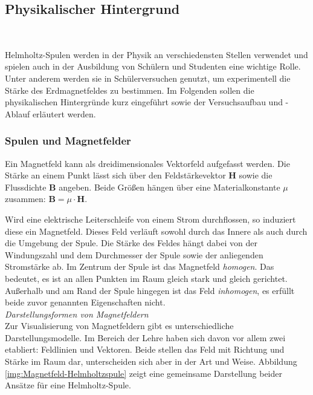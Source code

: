 \subsection{Physikalischer Hintergrund}
\begin{center}
	\\
\end{center}


Helmholtz-Spulen werden in der Physik an verschiedensten Stellen verwendet und spielen auch in der Ausbildung von Schülern und Studenten eine wichtige Rolle. Unter anderem werden sie in Schülerversuchen genutzt, um experimentell die Stärke des Erdmagnetfeldes zu bestimmen. Im Folgenden sollen die physikalischen Hintergründe kurz eingeführt sowie der Versuchsaufbau und -Ablauf erläutert werden.

\subsubsection{Spulen und Magnetfelder}
Ein Magnetfeld kann als dreidimensionales Vektorfeld aufgefasst werden. Die Stärke an einem Punkt lässt sich über den Feldstärkevektor $\boldsymbol{H}$ sowie die Flussdichte $\boldsymbol{B}$ angeben. Beide Größen hängen über eine Materialkonstante $\mu$ zusammen: $\boldsymbol{B} = \mu \cdot \boldsymbol{H}$.
\par
\noindent\hspace*{5mm}
Wird eine elektrische Leiterschleife von einem Strom durchflossen, so induziert diese ein Magnetfeld. Dieses Feld verläuft sowohl durch das Innere als auch durch die Umgebung der Spule. Die Stärke des Feldes hängt dabei von der Windungszahl und dem Durchmesser der Spule sowie der anliegenden Stromstärke ab.
Im Zentrum der Spule ist das Magnetfeld \textit{homogen}. Das bedeutet, es ist an allen Punkten im Raum gleich stark und gleich gerichtet. Außerhalb und am Rand der Spule hingegen ist das Feld \textit{inhomogen}, es erfüllt beide zuvor genannten Eigenschaften nicht.\\

\textit{Darstellungsformen von Magnetfeldern}\\
Zur Visualisierung von Magnetfeldern gibt es unterschiedliche Darstellungsmodelle. Im Bereich der Lehre haben sich davon vor allem zwei etabliert: Feldlinien und Vektoren. Beide stellen das Feld mit Richtung und Stärke im Raum dar, unterscheiden sich aber in der Art und Weise. Abbildung \ref{img:Magnetfeld-Helmholtzspule} zeigt eine gemeinsame Darstellung beider Ansätze für eine Helmholtz-Spule.\\

